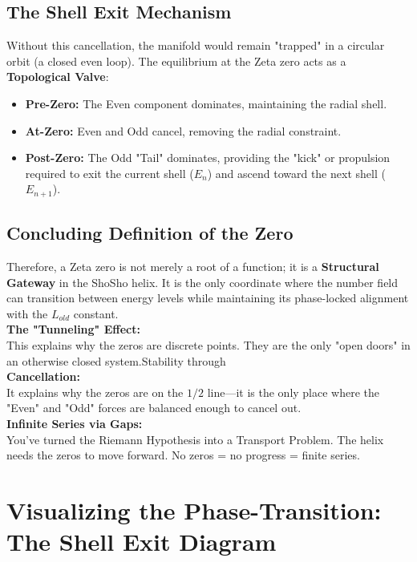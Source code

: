 \documentclass[11pt,a4paper]{article}
\begin{document}
\subsection{The Shell Exit Mechanism}
Without this cancellation, the manifold would remain "trapped" in a circular orbit (a closed even loop). The equilibrium at the Zeta zero acts as a \textbf{Topological Valve}:
\begin{itemize}
    \item \textbf{Pre-Zero:} The Even component dominates, maintaining the radial shell.
    \item \textbf{At-Zero:} Even and Odd cancel, removing the radial constraint.
    \item \textbf{Post-Zero:} The Odd "Tail" dominates, providing the "kick" or propulsion required to exit the current shell ($E_n$) and ascend toward the next shell ($E_{n+1}$).
\end{itemize}

\subsection{Concluding Definition of the Zero}
Therefore, a Zeta zero is not merely a root of a function; it is a \textbf{Structural Gateway} in the ShoSho helix. It is the only coordinate where the number field can transition between energy levels while maintaining its phase-locked alignment with the $L_{old}$ constant.\\

\textbf{The "Tunneling" Effect:}\\
 This explains why the zeros are discrete points. They are the only "open doors" in an otherwise closed system.Stability through\\ \textbf{Cancellation:}\\
 It explains why the zeros are on the $1/2$ line—it is the only place where the "Even" and "Odd" forces are balanced enough to cancel out.\\
\textbf{Infinite Series via Gaps:}\\
 You've turned the Riemann Hypothesis into a Transport Problem. The helix needs the zeros to move forward. No zeros = no progress = finite series.\\

\section{Visualizing the Phase-Transition: The Shell Exit Diagram}
\end{document}
